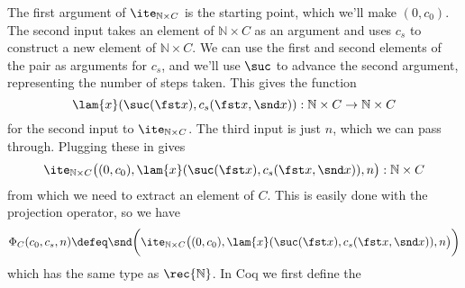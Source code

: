The first argument of $\ite_{\mathbb{N} \times C}$ is the starting point,
which we'll make $(0, c_{0})$.  The second input takes an element of
$\mathbb{N} \times C$ as an argument and uses $c_{s}$ to construct a new
element of $\mathbb{N} \times C$.  We can use the first and second elements of
the pair as arguments for $c_{s}$, and we'll use $\suc$ to advance the second
argument, representing the number of steps taken.  This gives the function
\[
\lam{x}(\suc(\fst x), c_{s}(\fst x, \snd x)) 
: \mathbb{N} \times C \to \mathbb{N} \times C
\]
for the second input to $\ite_{\mathbb{N} \times C}$.  The third input is just
$n$, which we can pass through.  Plugging these in gives
\[
\ite_{\mathbb{N} \times C}\big(
(0, c_{0}),
\lam{x}(\suc(\fst x), c_{s}(\fst x, \snd x)),
n
\big)
: \mathbb{N} \times C
\]
from which we need to extract an element of $C$.  This is easily done with the
projection operator, so we have
\[
\Phi_{C}(c_{0}, c_{s}, n) \defeq
\snd\bigg(
\ite_{\mathbb{N} \times C}\big(
(0, c_{0}),
\lam{x}(\suc(\fst x), c_{s}(\fst x, \snd x)),
n
\big)
\bigg)
\]
which has the same type as $\rec{\mathbb{N}}$.  In Coq we first define the
